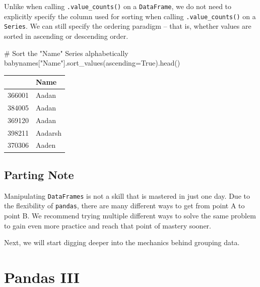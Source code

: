 \documentclass[
  letterpaper,
  DIV=11,
  numbers=noendperiod]{scrreprt}
\newenvironment{Shaded}{\begin{snugshade}}{\end{snugshade}}
\newcommand{\CommentTok}[1]{\textcolor[rgb]{0.37,0.37,0.37}{#1}}
\newcommand{\NormalTok}[1]{\textcolor[rgb]{0.00,0.23,0.31}{#1}}
\newcommand{\OperatorTok}[1]{\textcolor[rgb]{0.37,0.37,0.37}{#1}}
\newcommand{\StringTok}[1]{\textcolor[rgb]{0.13,0.47,0.30}{#1}}
\newcommand{\VariableTok}[1]{\textcolor[rgb]{0.07,0.07,0.07}{#1}}
\begin{document}
Unlike when calling \texttt{.value\_counts()} on a \texttt{DataFrame},
we do not need to explicitly specify the column used for sorting when
calling \texttt{.value\_counts()} on a \texttt{Series}. We can still
specify the ordering paradigm -- that is, whether values are sorted in
ascending or descending order.

\begin{Shaded}
\begin{Highlighting}[]
\CommentTok{\# Sort the "Name" Series alphabetically}
\NormalTok{babynames[}\StringTok{"Name"}\NormalTok{].sort\_values(ascending}\OperatorTok{=}\VariableTok{True}\NormalTok{).head()}
\end{Highlighting}
\end{Shaded}

\begin{tabular}{ll}
\toprule
{} &     Name \\
\midrule
366001 &    Aadan \\
384005 &    Aadan \\
369120 &    Aadan \\
398211 &  Aadarsh \\
370306 &    Aaden \\
\bottomrule
\end{tabular}

\hypertarget{parting-note-1}{%
\section{Parting Note}\label{parting-note-1}}

Manipulating \texttt{DataFrames} is not a skill that is mastered in just
one day. Due to the flexibility of \texttt{pandas}, there are many
different ways to get from point A to point B. We recommend trying
multiple different ways to solve the same problem to gain even more
practice and reach that point of mastery sooner.

Next, we will start digging deeper into the mechanics behind grouping
data.


\hypertarget{pandas-iii}{%
\chapter{Pandas III}\label{pandas-iii}}
\end{document}
